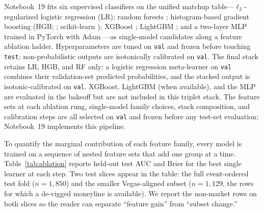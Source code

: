 \documentclass[12pt,oneside]{report}
\begin{document}
Notebook~19 fits six supervised classifiers on the unified matchup
table---$\ell_2$-regularized logistic regression (LR); random
forests \citep{breiman2001random}; histogram-based gradient boosting
(HGB; \citealp{friedman2001greedy}; scikit-learn
\citealp{scikitlearn2011}); XGBoost \citep{chen2016xgboost}; LightGBM
\citep{ke2017lightgbm}; and a two-layer MLP trained in PyTorch
\citep{paszke2019pytorch} with Adam \citep{kingma2014adam}---as single-model candidates along a feature ablation ladder.
Hyperparameters are tuned on \texttt{val} and frozen before touching
\texttt{test}; non-probabilistic outputs are isotonically calibrated
\citep{zadrozny2002transforming} on \texttt{val}.
The final stack retains LR, HGB, and RF only: a logistic regression meta-learner on \texttt{val} combines their validation-set predicted probabilities, and the stacked output is isotonic-calibrated on \texttt{val}.
XGBoost, LightGBM (when available), and the MLP are evaluated in the bakeoff but are not included in this triplet stack.
The feature sets at each ablation rung, single-model family choices, stack composition, and calibration steps are all selected on \texttt{val} and frozen before any test-set evaluation; Notebook~19 implements this pipeline.

To quantify the marginal contribution of each feature family, every
model is trained on a sequence of nested feature sets that add one
group at a time.  Table~\ref{tab:ablation} reports held-out test
AUC and Brier for the best single learner at each step.  Two test
slices appear in the table: the full event-ordered test fold
($n = 1{,}850$) and the smaller Vegas-aligned subset ($n = 1{,}129$,
the rows for which a de-vigged moneyline is available).  We report
the non-market rows on both slices so the reader can separate
``feature gain'' from ``subset change.''
\end{document}
